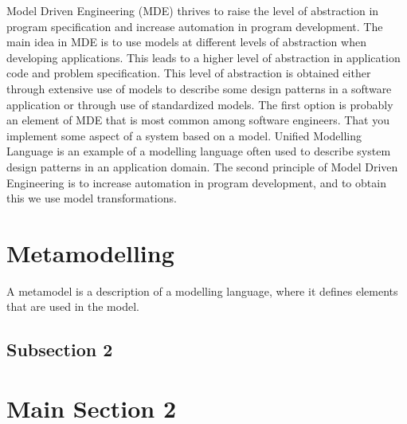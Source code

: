 Model Driven Engineering (MDE)\cite{France2007} thrives to raise the
level of abstraction in program specification and increase automation in program
development. The main idea in MDE is to use models at different levels of
abstraction when developing applications. This leads to a higher level
of abstraction in application code and problem specification. This level of
abstraction is obtained either through extensive use of models to describe some
design patterns in a software application or through use of standardized
models. The first option is probably an element of MDE that is most common
among software engineers. That you implement some aspect of a system based on a
model. Unified Modelling Language\cite{UML} is an example of a modelling
language often used to describe system design patterns in an application
domain. The second principle of Model Driven Engineering is to increase
automation in program development, and to obtain this we use model
transformations. \\

\section{Metamodelling}

 A metamodel is a description of a
modelling language, where it defines elements that are used in the model.


\subsection{Subsection 2}



\section{Main Section 2}

